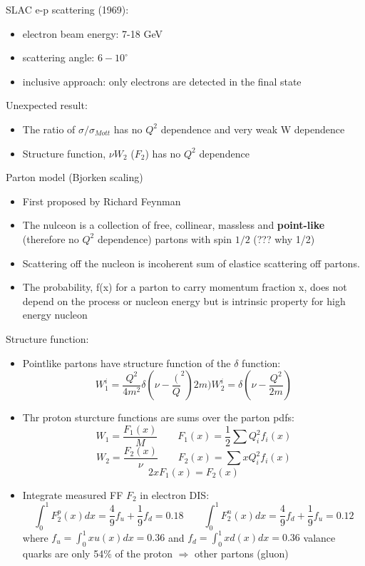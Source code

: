 SLAC e-p scattering (1969):
\begin{itemize}
    \item electron beam energy: 7-18 GeV
    \item scattering angle: $6-10^\circ$
    \item inclusive approach: only electrons are detected in the final state
\end{itemize}
Unexpected result:
\begin{itemize}
 \item The ratio of $\sigma/\sigma_{Mott}$ has no $Q^2$ dependence and 
     very weak W dependence
 \item Structure function, $\nu W_2$ ($F_2$) has no $Q^2$ dependence
\end{itemize}
Parton model (Bjorken scaling)

\begin{itemize}
    \item First proposed by Richard Feynman
    \item The nulceon is a collection of free, collinear, massless and 
	\textbf{point-like} (therefore no $Q^2$ dependence) partons with 
	spin $1/2$ (??? why 1/2)
    \item Scattering off the nucleon is incoherent sum of elastice scattering 
	off partons.
    \item The probability, f(x) for a parton to carry momentum fraction x,
	does not depend on the process or nucleon energy but is intrinsic 
	property for high energy nucleon
\end{itemize}
Structure function:
\begin{itemize}
    \item Pointlike partons have structure function of the $\delta$ function:
	$$ W_1^i = \frac{Q^2}{4m^2}\delta(\nu - \frac(Q^2){2m})
	 W_2^i = \delta(\nu - \frac{Q^2}{2m})$$
     \item Thr proton sturcture functions are sums over the parton pdfs:
	 $$ W_1 = \frac{F_1(x)}{M}  \qquad F_1(x) = \frac{1}{2}\sum Q_i^2 f_i(x) $$
	 $$ W_2 = \frac{F_2(x)}{\nu}  \qquad F_2(x) = \sum xQ_i^2 f_i(x) $$
	 $$ 2xF_1(x) = F_2(x) $$
     \item Integrate measured FF $F_2$ in electron DIS:
	 $$ \int_0^1 F_2^p(x)dx = \frac{4}{9}f_u + \frac{1}{9}f_d = 0.18 \qquad
	  \int_0^1 F_2^n(x)dx = \frac{4}{9}f_d + \frac{1}{9}f_u = 0.12 $$
	where $f_u = \int_0^1 xu(x)dx = 0.36$ and $f_d = \int_0^1 xd(x)dx = 0.36$ 
	valance quarks are only 54\% of the proton $\Rightarrow$ other partons (gluon)
\end{itemize}

